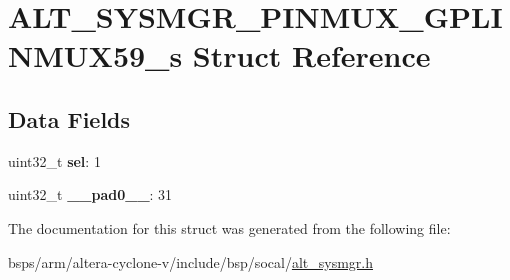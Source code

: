 \hypertarget{structALT__SYSMGR__PINMUX__GPLINMUX59__s}{}\section{A\+L\+T\+\_\+\+S\+Y\+S\+M\+G\+R\+\_\+\+P\+I\+N\+M\+U\+X\+\_\+\+G\+P\+L\+I\+N\+M\+U\+X59\+\_\+s Struct Reference}
\label{structALT__SYSMGR__PINMUX__GPLINMUX59__s}
\subsection*{Data Fields}
\begin{DoxyCompactItemize}
\item 
\mbox{\label{structALT__SYSMGR__PINMUX__GPLINMUX59__s_ab4bd44e85cfca5e77c2de792c0dcf277}} 
uint32\+\_\+t {\bfseries sel}\+: 1
\item 
\mbox{\label{structALT__SYSMGR__PINMUX__GPLINMUX59__s_af19e404a2fb801eec6e090c14140a435}} 
uint32\+\_\+t {\bfseries \+\_\+\+\_\+pad0\+\_\+\+\_\+}\+: 31
\end{DoxyCompactItemize}


The documentation for this struct was generated from the following file\+:\begin{DoxyCompactItemize}
\item 
bsps/arm/altera-\/cyclone-\/v/include/bsp/socal/\mbox{\hyperlink{alt__sysmgr_8h}{alt\+\_\+sysmgr.\+h}}\end{DoxyCompactItemize}
